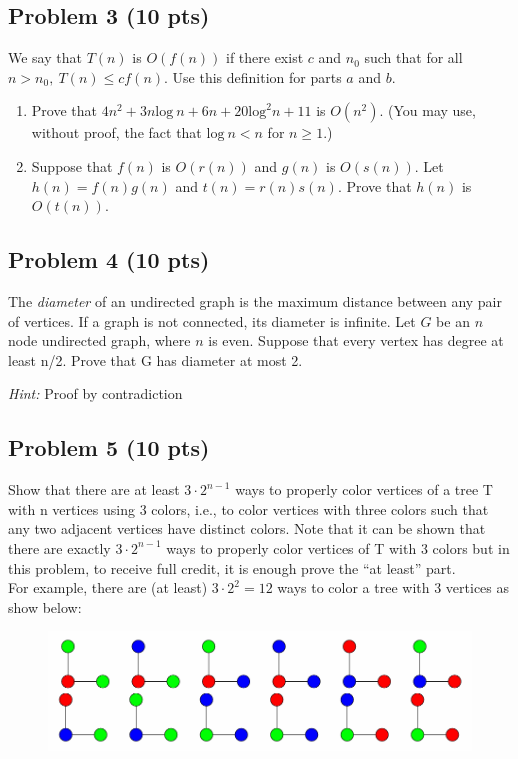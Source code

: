 \documentclass[12pt]{article}
\begin{document}
\subsection*{Problem 3 (10 pts)}
We say that $T(n)$ is $O(f(n))$ if there exist $c$ and $n_0$ such that for all $n > n_0,\:T(n) \le cf(n)$. Use this definition for parts $a$ and $b$.
\begin{enumerate}
    \item Prove that $4n^2 + 3n\text{log}\:n + 6n + 20\text{log}^2n + 11$ is $O(n^2)$. (You may use, without proof, the fact that $\text{log}\:n < n$ for $n \ge 1$.)
    \item Suppose that $f(n)$ is $O(r(n))$ and $g(n)$ is $O(s(n))$. Let $h(n) = f(n)g(n)$ and $t(n) = r(n)s(n)$. Prove that $h(n)$ is $O(t(n))$.
\end{enumerate}

\subsection*{Problem 4 (10 pts)}
The \textit{diameter} of an undirected graph is the maximum distance between any pair of vertices. If a graph is not connected, its diameter is infinite. Let $G$ be an $n$ node undirected graph, where $n$ is even. Suppose that every vertex has degree at least n/2. Prove that G has diameter at most 2.

\textit{Hint:} Proof by contradiction

\subsection*{Problem 5 (10 pts)}
Show that there are at least $3\cdot2^{n-1}$ ways to properly color vertices of a tree T with n vertices using 3 colors, i.e., to color vertices with three colors such that any two adjacent vertices have  distinct colors. Note that it can be shown that there are exactly $3\cdot2^{n-1}$ ways to properly color vertices of T with 3 colors but in this problem, to receive full credit, it is enough prove the “at least” part.\\
For example, there are (at least) $3\cdot2^2 = 12$ ways to color a tree with 3 vertices as show below:

\begin{figure}[H]
    \centering
    \includegraphics[width=0.8\linewidth]{P5.png}
    \label{fig:3-color-graph}
\end{figure}
\end{document}
